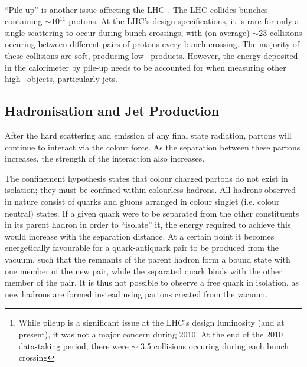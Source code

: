 ``Pile-up'' is another issue affecting the LHC\footnote{While pileup is a significant issue at the LHC's design luminosity (and at present), it was not a major concern during 2010. At the end of the 2010 data-taking period, there were $\sim$ 3.5 collisions occuring during each bunch crossing}.  The LHC collides bunches containing $\sim 10^{11}$ protons. At the LHC's design specifications, it is rare for only a single scattering to occur during bunch crossings, with (on average) $\sim23$ collisions occuring between different pairs of protons every bunch crossing. The majority of these collisions are soft, producing low \pt~products. However, the energy deposited in the calorimeter by pile-up needs to be accounted for when measuring other high \pt~objects, particularly jets.

\subsection{Hadronisation and Jet Production}


After the hard scattering and emission of any final state radiation, partons will continue to interact via the colour force. As the separation between these partons increases, the strength of the interaction also increases. 

The confinement hypothesis states that colour charged partons do not exist in isolation; they must be confined within colourless hadrons\cite{burgessSM}. All hadrons observed in nature consist of quarks and gluons arranged in colour singlet (i.e. colour neutral) states. If a given quark were to be separated from the other constituents in its parent hadron in order to ``isolate'' it, the energy required to achieve this would increase with the separation distance. At a certain point it becomes energetically favourable for a quark-antiquark pair to be produced from the vacuum, such that the remnants of the parent hadron form a bound state with one member of the new pair, while the separated quark binds with the other member of the pair. It is thus not possible to observe a free quark in isolation, as new hadrons are formed instead using partons created from the vacuum. 

